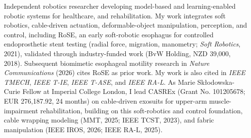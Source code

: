 
Independent robotics researcher developing model-based and learning-enabled robotic 
systems for healthcare, and rehabilitation. 
My work integrates soft robotics, cable-driven actuation, 
deformable-object manipulation, perception, and control, 
including RoSE, an early soft-robotic esophagus for controlled endoprosthetic 
stent testing (radial force, migration, manometry; \textit{Soft Robotics}, 2021), 
validated through industry-funded work (BvW Holding, NZD 39,000, 2018). 
Subsequent biomimetic esophageal motility research in \textit{Nature Communications} (2026) 
cites RoSE as prior work. My work is also cited in \textit{IEEE TMECH}, \textit{IEEE T-IE}, 
\textit{IEEE T-ASE}, and \textit{IEEE RA-L}. As Marie Skłodowska-Curie Fellow at 
Imperial College London, 
I lead CASREx (Grant No. 101205678; EUR 276,187.92, 24 months) on cable-driven 
exosuits for upper-arm muscle-impairment rehabilitation, 
building on this soft-robotics and control foundation, cable wrapping modeling 
(MMT, 2025; IEEE TCST, 2023), and 
fabric manipulation (IEEE IROS, 2026; IEEE RA-L, 2025).